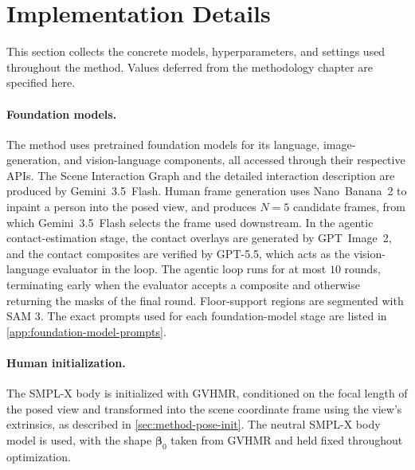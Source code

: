 \FloatBarrier
\section{Implementation Details}
\label{sec:implementation-details}

This section collects the concrete models, hyperparameters, and settings used throughout the method. Values deferred from the methodology chapter are specified here.

\paragraph{Foundation models.} The method uses pretrained foundation models for its language, image-generation, and vision-language components, all accessed through their respective APIs. The Scene Interaction Graph and the detailed interaction description are produced by Gemini~3.5~Flash. Human frame generation uses Nano~Banana~2 to inpaint a person into the posed view, and produces $N = 5$ candidate frames, from which Gemini~3.5~Flash selects the frame used downstream. In the agentic contact-estimation stage, the contact overlays are generated by GPT~Image~2, and the contact composites are verified by GPT-5.5, which acts as the vision-language evaluator in the loop. The agentic loop runs for at most $10$ rounds, terminating early when the evaluator accepts a composite and otherwise returning the masks of the final round. Floor-support regions are segmented with SAM 3. The exact prompts used for each foundation-model stage are listed in \cref{app:foundation-model-prompts}.

\paragraph{Human initialization.} The SMPL-X body is initialized with GVHMR, conditioned on the focal length of the posed view and transformed into the scene coordinate frame using the view's extrinsics, as described in \cref{sec:method-pose-init}. The neutral SMPL-X body model is used, with the shape $\boldsymbol{\beta}_0$ taken from GVHMR and held fixed throughout optimization.

